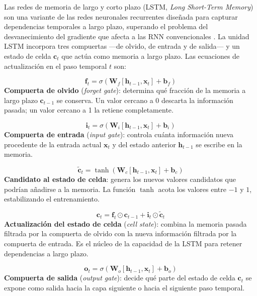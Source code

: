 Las redes de memoria de largo y corto plazo (LSTM, \textit{Long Short-Term Memory}) son una variante de las redes neuronales recurrentes diseñada para capturar dependencias temporales a largo plazo, superando el problema del desvanecimiento del gradiente que afecta a las RNN convencionales \cite{ozcan2024, li2021}. La unidad LSTM incorpora tres compuertas —de olvido, de entrada y de salida— y un estado de celda $\mathbf{c}_t$ que actúa como memoria a largo plazo. Las ecuaciones de actualización en el paso temporal $t$ son:

\begin{equation}
\mathbf{f}_t = \sigma(\mathbf{W}_f [\mathbf{h}_{t-1}, \mathbf{x}_t] + \mathbf{b}_f)
\end{equation}
\noindent\textbf{Compuerta de olvido} (\textit{forget gate}): determina qué fracción de la memoria a largo plazo $\mathbf{c}_{t-1}$ se conserva. Un valor cercano a 0 descarta la información pasada; un valor cercano a 1 la retiene completamente.

\begin{equation}
\mathbf{i}_t = \sigma(\mathbf{W}_i [\mathbf{h}_{t-1}, \mathbf{x}_t] + \mathbf{b}_i)
\end{equation}
\noindent\textbf{Compuerta de entrada} (\textit{input gate}): controla cuánta información nueva procedente de la entrada actual $\mathbf{x}_t$ y del estado anterior $\mathbf{h}_{t-1}$ se escribe en la memoria.

\begin{equation}
\tilde{\mathbf{c}}_t = \tanh(\mathbf{W}_c [\mathbf{h}_{t-1}, \mathbf{x}_t] + \mathbf{b}_c)
\end{equation}
\noindent\textbf{Candidato al estado de celda}: genera los nuevos valores candidatos que podrían añadirse a la memoria. La función $\tanh$ acota los valores entre $-1$ y $1$, estabilizando el entrenamiento.

\begin{equation}
\mathbf{c}_t = \mathbf{f}_t \odot \mathbf{c}_{t-1} + \mathbf{i}_t \odot \tilde{\mathbf{c}}_t
\end{equation}
\noindent\textbf{Actualización del estado de celda} (\textit{cell state}): combina la memoria pasada filtrada por la compuerta de olvido con la nueva información filtrada por la compuerta de entrada. Es el núcleo de la capacidad de la LSTM para retener dependencias a largo plazo.

\begin{equation}
\mathbf{o}_t = \sigma(\mathbf{W}_o [\mathbf{h}_{t-1}, \mathbf{x}_t] + \mathbf{b}_o)
\end{equation}
\noindent\textbf{Compuerta de salida} (\textit{output gate}): decide qué parte del estado de celda $\mathbf{c}_t$ se expone como salida hacia la capa siguiente o hacia el siguiente paso temporal.

